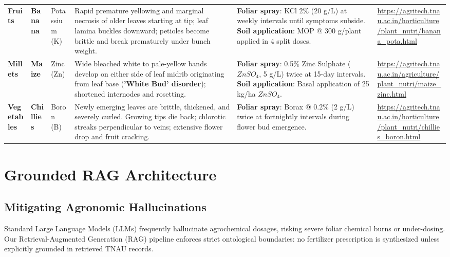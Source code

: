 \documentclass[9pt,twocolumn,a4paper,landscape]{article}
\begin{document}
\begin{table}[t]
\begin{tabularx}{\textwidth}{p{1.4cm} p{1.6cm} p{1.5cm} p{6.2cm} p{8.2cm} p{3.2cm}}
\textbf{Fruits} & \textbf{Banana} & Potassium (K) & Rapid premature yellowing and marginal necrosis of older leaves starting at tip; leaf lamina buckles downward; petioles become brittle and break prematurely under bunch weight. & \textbf{Foliar spray}: KCl 2\% (20 g/L) at weekly intervals until symptoms subside. \newline\textbf{Soil application}: MOP @ 300 g/plant applied in 4 split doses. & \url{https://agritech.tnau.ac.in/horticulture/plant_nutri/banana_pota.html} \\

\rowcolor{gray!8}
\textbf{Millets} & \textbf{Maize} & Zinc (Zn) & Wide bleached white to pale-yellow bands develop on either side of leaf midrib originating from leaf base (\textbf{'White Bud' disorder}); shortened internodes and rosetting. & \textbf{Foliar spray}: 0.5\% Zinc Sulphate ($ZnSO_4$, 5 g/L) twice at 15-day intervals. \newline\textbf{Soil application}: Basal application of 25 kg/ha $ZnSO_4$. & \url{https://agritech.tnau.ac.in/agriculture/plant_nutri/maize_zinc.html} \\

\textbf{Vegetables} & \textbf{Chillies} & Boron (B) & Newly emerging leaves are brittle, thickened, and severely curled. Growing tips die back; chlorotic streaks perpendicular to veins; extensive flower drop and fruit cracking. & \textbf{Foliar spray}: Borax @ 0.2\% (2 g/L) twice at fortnightly intervals during flower bud emergence. & \url{https://agritech.tnau.ac.in/horticulture/plant_nutri/chillies_boron.html} \\
\bottomrule
\end{tabularx}
\end{table}

\section{Grounded RAG Architecture}
\label{sec:rag}

\subsection{Mitigating Agronomic Hallucinations}
Standard Large Language Models (LLMs) frequently hallucinate agrochemical dosages, risking severe foliar chemical burns or under-dosing. Our Retrieval-Augmented Generation (RAG) pipeline enforces strict ontological boundaries: no fertilizer prescription is synthesized unless explicitly grounded in retrieved TNAU records.
\end{document}
